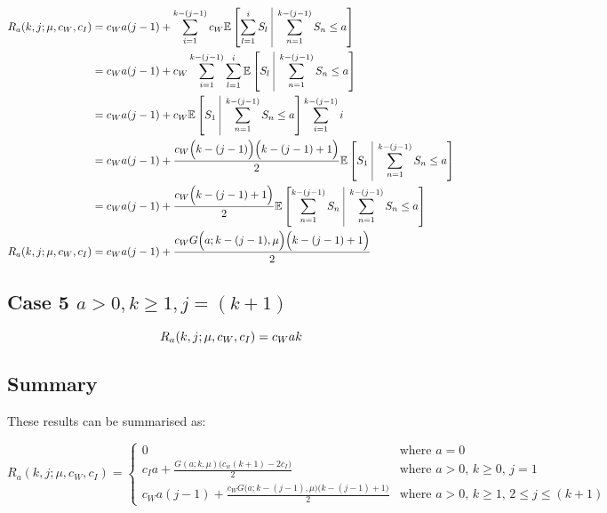 \documentclass{article}
\begin{document}
\begin{align*}
	R_{a} (k, j; \mu, c_{W}, c_{I}) & = c_{W} a (j - 1) + \sum_{i = 1}^{k - (j - 1)} c_{W} \mathbb{E} \left[ \sum_{l = 1}^{i} S_{l} \ \vline \ \sum_{n = 1}^{k - (j - 1)} S_{n} \leq a \right] \\
	& = c_{W} a (j - 1) + c_{W} \sum_{i = 1}^{k - (j - 1)} \sum_{l = 1}^{i} \mathbb{E} \left[ S_{l} \ \vline \ \sum_{n = 1}^{k - (j - 1)} S_{n} \leq a \right] \\
	& = c_{W} a (j - 1) + c_{W} \mathbb{E} \left[ S_{1} \ \vline \ \sum_{n = 1}^{k - (j - 1)} S_{n} \leq a \right] \sum_{i = 1}^{k - (j - 1)} i \\
	& = c_{W} a (j - 1) + \frac{c_{W} \Big( k - (j - 1) \Big) \Big( k - (j - 1) + 1 \Big)}{2} \mathbb{E} \left[ S_{1} \ \vline \ \sum_{n = 1}^{k - (j - 1)} S_{n} \leq a \right] \\
	& = c_{W} a (j - 1) + \frac{c_{W} \Big( k - (j - 1) + 1 \Big)}{2} \mathbb{E} \left[ \sum_{n = 1}^{k - (j - 1)} S_{n} \ \vline \ \sum_{n = 1}^{k - (j - 1)} S_{n} \leq a \right] \\
	R_{a} (k, j; \mu, c_{W}, c_{I}) & = c_{W} a (j - 1) + \frac{c_{W} G \Big( a; k - (j - 1), \mu \Big) \Big( k - (j - 1) + 1 \Big)}{2} \\
\end{align*}

\subsection{Case 5 $a > 0, k \geq 1, j = (k + 1)$}

\begin{equation*}
	R_{a} (k, j; \mu, c_{W}, c_{I}) = c_{W} a k \\
\end{equation*}

\newpage

\subsection{Summary}

These results can be summarised as:

\begin{equation}
	R_{a} (k, j; \mu, c_{W}, c_{I}) = \begin{cases} 0 & \text{where $a = 0$} \\
						c_{I} a + \frac{G (a; k, \mu) \big( c_{w} (k + 1) - 2 c_{I} \big)}{2} & \text{where $a > 0$, $k \geq 0$, $j = 1$} \\
						c_{W} a (j - 1) + \frac{c_{W} G \big( a; k - (j - 1), \mu \big) \big( k - (j - 1) + 1 \big)}{2} & \text{where $a > 0$, $k \geq 1$, $2 \leq j \leq (k + 1)$} \end{cases}
\end{equation}
\end{document}
